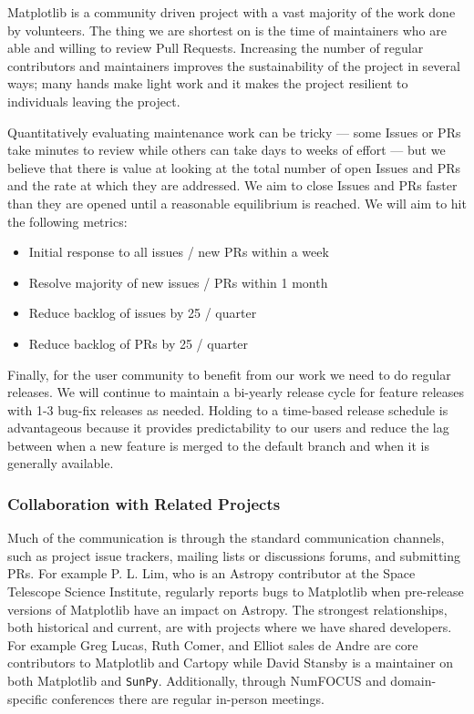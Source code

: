\documentclass[12pt]{article}
\numberwithin{page}{section}
\begin{document}
Matplotlib is a community driven project with a vast majority of the
work done by volunteers.  The thing we are shortest on is the time of
maintainers who are able and willing to review Pull Requests.
Increasing the number of regular contributors and maintainers improves
the sustainability of the project in several ways; many hands make
light work and it makes the project resilient to individuals leaving
the project.

Quantitatively evaluating maintenance work can be tricky --- some
Issues or PRs take minutes to review while others can take days to
weeks of effort --- but we believe that there is value at looking at
the total number of open Issues and PRs and the rate at which they are
addressed.  We aim to close Issues and PRs faster than they are opened
until a reasonable equilibrium is reached.  We will aim to hit the
following metrics:
\begin{itemize}[noitemsep]
\item Initial response to all issues / new PRs within a week
\item Resolve majority of new issues / PRs within 1 month
\item Reduce backlog of issues by 25 / quarter
\item Reduce backlog of PRs by 25 / quarter
\end{itemize}

Finally, for the user community to benefit from our work we need to do
regular releases.  We will continue to maintain a bi-yearly release
cycle for feature releases with 1-3 bug-fix releases as needed.
Holding to a time-based release schedule is advantageous because it
provides predictability to our users and reduce the lag between when a
new feature is merged to the default branch and when it is generally
available.


\subsubsection{Collaboration with Related Projects}


Much of the communication is through the standard communication channels, such
as project issue trackers, mailing lists or discussions forums, and submitting
PRs.  For example P. L. Lim, who is an Astropy contributor at the Space
Telescope Science Institute, regularly reports bugs to Matplotlib when
pre-release versions of Matplotlib have an impact on Astropy.  The strongest
relationships, both historical and current, are with projects where we have
shared developers.  For example Greg Lucas, Ruth Comer, and Elliot sales de
Andre are core contributors to Matplotlib and Cartopy while David Stansby is a
maintainer on both Matplotlib and \texttt{SunPy}.  Additionally, through
NumFOCUS and domain-specific conferences there are regular in-person meetings.
\end{document}
